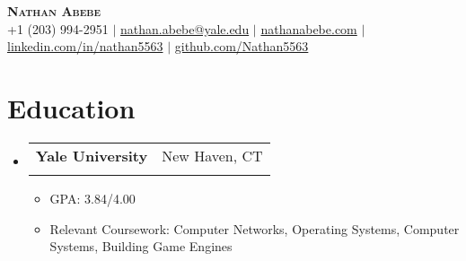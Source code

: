 \documentclass[letterpaper,11pt]{article}
\makeatletter
\newcommand{\resumeItem}[1]{
  \item\small{
    {#1 \vspace{-2pt}}
  }
}
\newcommand{\resumeSubheading}[4]{
  \vspace{-2pt}\item
    \begin{tabular*}{0.97\textwidth}[t]{l@{\extracolsep{\fill}}r}
      \textbf{#1} & #2 \\
      \text{\small#3} & \text{\small #4} \\
    \end{tabular*}\vspace{-7pt}
}
\newcommand{\resumeSubHeadingListStart}{\begin{itemize}[leftmargin=0.15in, label={}]}
\newcommand{\resumeSubHeadingListEnd}{\end{itemize}}
\newcommand{\resumeItemListStart}{\begin{itemize}}
\newcommand{\resumeItemListEnd}{\end{itemize}\vspace{-5pt}}
\makeatother
\begin{document}

\begin{center}
    \textbf{\Huge \scshape Nathan Abebe} \\ \vspace{5pt}
    \small +1 (203) 994-2951 $|$ \href{mailto:nathan.abebe@yale.edu}{nathan.abebe@yale.edu} $|$ \href{https://nathanabebe.com}{nathanabebe.com} $|$ 
    \href{https://linkedin.com/in/nathan5563}{linkedin.com/in/nathan5563} $|$
    \href{https://github.com/Nathan5563}{github.com/Nathan5563}
\end{center}

\section{Education}
  \resumeSubHeadingListStart
    \resumeSubheading
      {Yale University}{New Haven, CT}
      {B.S. Computer Science, B.S. Electrical Engineering (ABET)}{May 2028}
      \resumeItemListStart
        \resumeItem{GPA: 3.84/4.00}
        \resumeItem{Relevant Coursework: Computer Networks, Operating Systems, Computer Systems, Building Game Engines }
      \resumeItemListEnd
  \resumeSubHeadingListEnd


\end{document}
